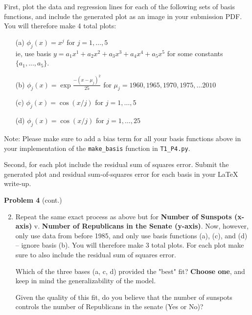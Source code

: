 \documentclass[submit]{harvardml}
\begin{document}
\begin{problem}
\begin{enumerate}
First, plot the data and regression lines for each of the following sets of basis functions, and include
the generated plot as an image in your submission PDF. You will therefore make 4 total plots:
\begin{enumerate}
	\item[(a)] $\phi_j(x) = x^j$ for $j=1, \ldots, 5$\\
    ie, use basis $y = a_1 x^1 + a_2 x^2 + a_3 x^3 + a_4 x^4 + a_5 x^5$ for some constants $\{a_1, ..., a_5\}$. 
    \item[(b)] $\phi_j(x) = \exp{\frac{-(x-\mu_j)^2}{25}}$ for $\mu_j=1960, 1965, 1970, 1975, \ldots 2010$
	\item[(c)] $\phi_j(x) = \cos(x / j)$ for $j=1, \ldots, 5$
	\item[(d)] $\phi_j(x) = \cos(x / j)$ for $j=1, \ldots, 25$
\end{enumerate}
\vspace{-2mm}


{\footnotesize * Note: Please make sure to add a bias term for all your basis functions above in your implementation of the \verb|make_basis| function in \verb|T1_P4.py|.}
  
Second, for each plot include the residual sum of squares error. Submit the generated plot and residual sum-of-squares error for each basis in your LaTeX write-up.
\end{enumerate}

\end{problem}

\begin{framed}
\noindent\textbf{Problem 4} (cont.)\\
\begin{enumerate}
\setcounter{enumi}{1}
\item Repeat the same exact process as above but for \textbf{Number of Sunspots (x-axis)} v. \textbf{Number of Republicans in the Senate (y-axis)}. 
Now, however, only use data from before 1985, and only use basis functions (a), (c), and (d) -- ignore basis (b). You will therefore make 3 total plots. For each plot make sure to also include the residual sum of squares error.



Which of the three bases (a, c, d) provided the "best" fit? \textbf{Choose one}, and keep in mind the generalizability of the model. 

Given the quality of this fit, do you believe that the number of sunspots controls the number of Republicans in the senate (Yes or No)?
\end{enumerate}
\end{framed}
\end{document}
